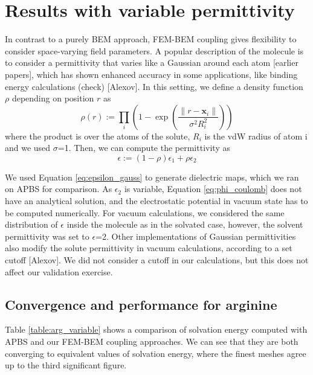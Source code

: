 \section*{\sffamily \Large Results with variable permittivity}

In contrast to a purely BEM approach, FEM-BEM coupling gives flexibility to consider space-varying field parameters. 
A popular description of the molecule is to consider a permittivity that varies like a Gaussian around each atom [earlier papers], which has shown enhanced accuracy in some applications, like binding energy calculations (check) [Alexov].
In this setting, we define a density function $\rho$ depending on position $r$ as
%
\begin{equation}
\rho(r) := \prod_i \left(1 - \exp{\left(\frac{\|r-\mathbf{x}_i\|}{\sigma^2 R_i^2}\right)}\right)
\end{equation}
%
where the product is over the atoms of the solute, $R_i$ is the vdW
radius of atom i and we used $\sigma$=1. Then, we can compute the permittivity as
%
\begin{equation}
\epsilon := \left(1-\rho \right) \epsilon_1 + \rho\epsilon_2
\end{equation}
%

We used Equation \eqref{eq:epsilon_gauss} to generate dielectric maps, which we ran on APBS for comparison. 
As $\epsilon_2$ is variable, Equation \eqref{eq:phi_coulomb} does not have an analytical solution, and the electrostatic potential in vacuum state has to be computed numerically.
For vacuum calculations, we considered the same distribution of $\epsilon$ inside the molecule as in the solvated case, however, the solvent permittivity was set to $\epsilon$=2. 
Other implementations of Gaussian permittivities also modify the solute permittivity in vacuum calculations, according to a set cutoff [Alexov]. 
We did not consider a cutoff in our calculations, but this does not affect our validation exercise. 

\subsection*{\sffamily \large Convergence and performance for arginine}

Table \ref{table:arg_variable} shows a comparison of solvation energy computed with APBS and our FEM-BEM coupling approaches. We can see that they are both converging to equivalent values of solvation energy, where the finest meshes agree up to the third significant figure.

